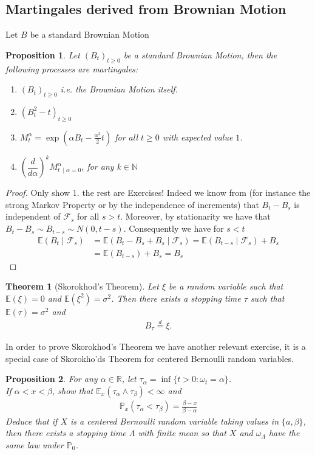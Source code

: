 \documentclass[11pt,a4paper, final]{article}
\newtheorem{thm}{Theorem}[section]
\newtheorem{prop}{Proposition}[section]
\theoremstyle{definition}
\begin{document}
\subsection{Martingales derived from Brownian Motion}
Let $B$ be a standard Brownian Motion
\begin{prop} Let $(B_t)_{t \geq 0}$ be a standard Brownian Motion, then the following processes are martingales:
\begin{enumerate}
\item $(B_t)_{t \geq 0}$ i.e. the Brownian Motion itself. 
\item $(B_t^2-t)_{t \geq 0}$ 
\item $M_t^\alpha = \exp\left( \alpha B_t - \frac{\alpha^2}{2}t \right)$ for all $t \geq 0$ with expected value $1$. 
\item $\left( \dfrac{d}{d \alpha} \right)^k M_{t \ \mid \alpha =0} ^\alpha$, for any $k \in \mathbb{N}$
\end{enumerate}
\end{prop}
\begin{proof} Only show 1. the rest are Exercises! Indeed we know from (for instance the strong Markov Property or by the independence of increments) that $B_t-B_s$ is independent of $\mathcal{F}_s$ for all $s>t$. Moreover, by stationarity we have that $B_t-B_s \sim B_{t-s} \sim N(0,t-s)$. Consequently we have for $s<t$ \begin{align*}
\mathbb{E}(B_t \mid \mathcal{F}_s)&= \mathbb{E}(B_t-B_s + B_s \mid \mathcal{F}_s) = \mathbb{E}(B_{t-s} \mid \mathcal{F}_s) + B_s \\
&= \mathbb{E}(B_{t-s} ) + B_s = B_s
\end{align*}
\end{proof}
\begin{thm}[Skorokhod's Theorem] Let $\xi$ be a random variable such that $\mathbb{E}( \xi)=0$ and $\mathbb{E}( \xi^2)= \sigma^2$. Then there exists a stopping time $\tau$ such that $\mathbb{E}( \tau)= \sigma^2$ and 
\begin{align*}
B_\tau \overset{d}= \xi. 
\end{align*}
\end{thm}
\noindent In order to prove Skorokhod's Theorem we have another relevant exercise, it is a special case of Skorokho'ds Theorem for centered Bernoulli random variables. 
\begin{prop} For any $\alpha \in \mathbb{R}$, let $\tau_\alpha = \inf \lbrace t >0 : \omega_t = \alpha \rbrace$. \\ If $\alpha < x < \beta$, show that $\mathbb{E}_x( \tau_\alpha \wedge \tau_\beta) < \infty$ and 
\begin{align*}
\mathbb{P}_x ( \tau_\alpha < \tau_\beta) = \frac{\beta-x}{\beta-\alpha}
\end{align*}
Deduce that if $X$ is a centered Bernoulli random variable taking values in $\lbrace a, \beta \rbrace$, then there exists a stopping time $\Lambda$ with finite mean so that $X$ and $\omega_\Lambda$ have the same law under $\mathbb{P}_0$. 
\end{prop}
\end{document}
